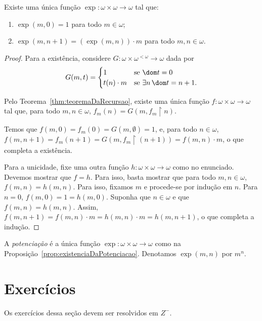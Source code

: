 \begin{proposition}[$Z^-$]\label{prop:existenciaDaPotenciacao}
    Existe uma única função $\exp: \omega\times \omega\to \omega$ tal que:
    \begin{enumerate}[label=(\roman*)]
        \item $\exp(m, 0)=1$ para todo $m \in \omega$;
        \item $\exp(m, n+1)=(\exp(m, n))\cdot m$ para todo $m, n \in \omega$.
    \end{enumerate}
\end{proposition}
\begin{proof}
    Para a existência, considere $G:\omega\times \omega^{<\omega}\to \omega$ dada por
    \[G(m, t)=\begin{cases}
        1 & \text{se } \dom t = 0\\
        t(n)\cdot m & \text{se } \exists n \,\dom t = n+1.
    \end{cases}
    \]

    Pelo Teorema~\ref{thm:teoremaDaRecursao}, existe uma única função $f:\omega\times \omega\to \omega$ tal que, para todo $m, n \in \omega$, $f_m(n)=G(m, f_m\restriction n)$.

    Temos que $f(m, 0)=f_m(0)=G(m, \emptyset)=1$, e, para todo $n \in \omega$, $f(m, n+1)=f_m(n+1)=G(m, f_m\restriction (n+1))=f(m, n)\cdot m$, o que completa a existência.

    Para a unicidade, fixe uma outra função $h:\omega\times \omega\to \omega$ como no enunciado.
    Devemos mostrar que $f=h$.
    Para isso, basta mostrar que para todo $m, n \in \omega$, $f(m, n)=h(m, n)$.
    Para isso, fixamos $m$ e procede-se por indução em $n$.
    Para $n=0$, $f(m, 0)=1=h(m, 0)$.
    Suponha que $n\in \omega$ e que $f(m, n)=h(m, n)$.
    Assim, $f(m, n+1)=f(m, n)\cdot m=h(m, n)\cdot m=h(m, n+1)$, o que completa a indução.
\end{proof}

\begin{definition}[$Z^-$]\label{def:potenciacao}
    A \emph{potenciação} é a única função $\exp: \omega\times \omega\to \omega$ como na Proposição~\ref{prop:existenciaDaPotenciacao}.
    Denotamos $\exp(m, n)$ por $m^n$.
\end{definition}

\section*{Exercícios}
Os exercícios dessa seção devem ser resolvidos em $Z^-$.


